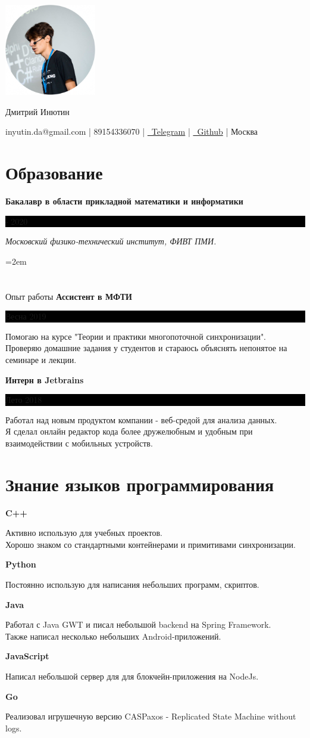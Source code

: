 \documentclass[fontsize=11pt]{article}
\newcommand{\MyName}[1]{ %
    \Huge \centering #1
    \par \normalsize \normalfont}
\newcommand{\NewPart}[1]{\section*{#1}}
\newcommand{\ProgrammingEntry}[2]{
    \noindent \textbf{#1} \hfill      %

    \noindent \small #2 %
    \normalsize \par}
\newcommand{\EducationEntry}[4]{
    \noindent \textbf{#1} \hfill      %
    \colorbox{Black}{
      \parbox{10em}{
      \color{White} \centering #2}} \par   %
    \noindent \textit{#3} \par        %
    \noindent\hangindent=2em\hangafter=0 \small #4 %
    \normalsize \par}
\newcommand{\WorkEntry}[3]{       %
    \noindent \large \textbf{#1} \hfill      %
    \colorbox{Black}{%
      \parbox{10em}{%
      \color{White} \centering #2}} \par  %
    \noindent \small #3 %
    \normalsize \par}
\begin{document}
\begin{minipage}{0.2\textwidth}%
\includegraphics[width=4cm]{me.png}
\end{minipage}%
\hfill%
\begin{minipage}{14cm}\raggedright
\bigskip
\bigskip
\bigskip
\bigskip
\bigskip
\bigskip
\MyName{Дмитрий Инютин}
\bigskip
{inyutin.da@gmail.com | 89154336070 | \href{https://t.me/inyutin}{\faTelegram \, Telegram} | \href{https://github.com/inyutin}{\faGithub \, Github} | Москва}
\end{minipage}



\NewPart{Образование}{}
\EducationEntry
{Бакалавр в области прикладной математики и информатики}
{2016 - 2020}
{Московский физико-технический институт, ФИВТ ПМИ.}

\NewPart{Опыт работы}{}
\WorkEntry
{Ассистент в МФТИ}
{Весна 2019}
{Помогаю на курсе "Теории и практики многопоточной синхронизации". \\ Проверяю домашние задания у студентов и стараюсь объяснять непонятое на семинаре и лекции.}

\bigskip

\WorkEntry
{Интерн в Jetbrains}
{Лето 2018}
{Работал над новым продуктом компании - веб-средой для анализа данных. \\ Я сделал онлайн редактор кода более дружелюбным и удобным при взаимодействии с мобильных устройств.}

\NewPart{Знание языков программирования}{}
\ProgrammingEntry
{C++ \bigstar \bigstar \bigstar}
{Активно использую для учебных проектов. \\ Хорошо знаком со стандартными контейнерами и примитивами синхронизации.}
\bigskip
\ProgrammingEntry
{Python \bigstar \bigstar \bigstar}
{Постоянно использую для написания небольших программ, скриптов.}
\bigskip
\ProgrammingEntry
{Java \bigstar \bigstar}
{Работал с Java GWT и писал небольшой backend на Spring Framework. \\
Также написал несколько небольших Android-приложений.}
\bigskip
\ProgrammingEntry
{JavaScript \bigstar \bigstar}
{Написал небольшой сервер для для блокчейн-приложения на NodeJs.}
\bigskip
\ProgrammingEntry
{Go \bigstar}
{Реализовал игрушечную версию CASPaxos - Replicated State Machine without logs.}
\end{document}
